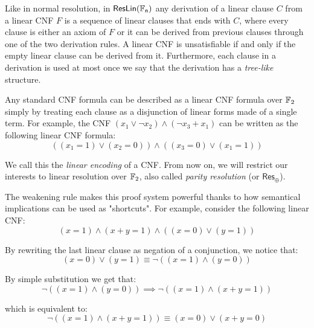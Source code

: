 Like in normal resolution, in $\mathsf{ResLin(\mathbb{F}_n)}$ any derivation of a linear clause $C$ from a linear CNF $F$ is a sequence of linear clauses that ends with $C$, where every clause is either an axiom of $F$ or it can be derived from previous clauses through one of the two derivation rules. A linear CNF is unsatisfiable if and only if the empty linear clause can be derived from it. Furthermore, each clause in a derivation is used at most once we say that the derivation has a \textit{tree-like} structure.

Any standard CNF formula can be described as a linear CNF formula over $\mathbb{F}_2$ simply by treating each clause as a disjunction of linear forms made of a single term. For example, the CNF $(x_1 \lor \lnot{x_2}) \land (\lnot{x_3} + x_1)$ can be written as the following linear CNF formula:
\[((x_1 = 1) \lor (x_2 = 0)) \land ((x_3 = 0) \lor (x_1 = 1))\]

We call this the \textit{linear encoding} of a CNF. From now on, we will restrict our interests to linear resolution over $\mathbb{F}_2$, also called \textit{parity resolution} (or $\mathsf{Res}_\oplus$).

The weakening rule makes this proof system powerful thanks to how semantical implications can be used as "shortcuts". For example, consider the following linear CNF:
\[(x = 1) \land (x+y = 1) \land ((x = 0) \lor (y = 1))\]

By rewriting the last linear clause as negation of a conjunction, we notice that:
\[(x = 0) \lor (y = 1) \equiv \lnot ((x = 1) \land (y = 0))\]

By simple substitution we get that:
\[\lnot ((x = 1) \land (y = 0)) \implies  \lnot ((x = 1) \land (x+y = 1))\]

which is equivalent to:
\[\lnot ((x = 1) \land (x+y = 1)) \equiv  (x = 0) \lor (x+y = 0)\]

